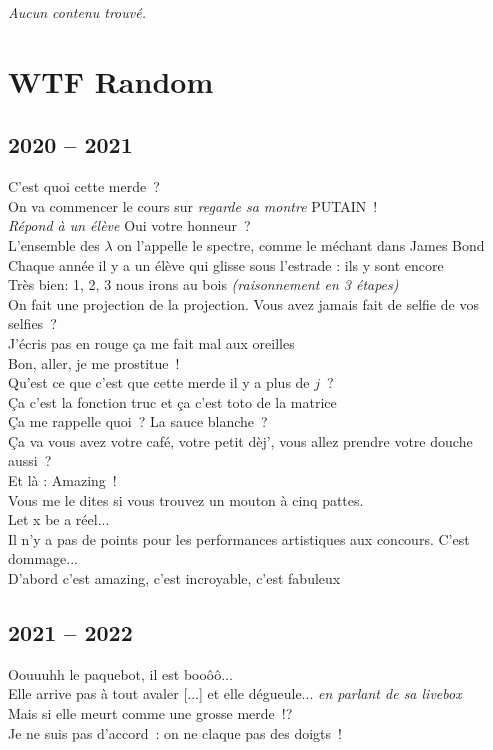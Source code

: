\documentclass[french, a4paper, openany]{book}
\begin{document}
	 \noindent \emph{Aucun contenu trouvé.} \\
 
\chapter{WTF Random}

\section{2020 -- 2021}

	\noindent \og C'est quoi cette merde~? \fg \\
	\og On va commencer le cours sur \emph{regarde sa montre} PUTAIN~! \fg \\
	\emph{Répond à un élève} \og Oui votre honneur~? \fg \\
	\og L'ensemble des $\lambda$ on l'appelle le spectre, comme le méchant dans James Bond \fg \\
	\og Chaque année il y a un élève qui glisse sous l'estrade : ils y sont encore \fg \\
	\og Très bien: 1, 2, 3 nous irons au bois \fg \emph{(raisonnement en 3 étapes)} \\
	\og On fait une projection de la projection. Vous avez jamais fait de selfie de vos selfies~? \fg \\
	\og J'écris pas en rouge ça me fait mal aux oreilles \fg \\
	\og Bon, aller, je me prostitue~! \fg \\
	\og Qu'est ce que c'est que cette merde il y a plus de $j$~? \fg \\
	\og Ça c'est la fonction truc et ça c'est toto de la matrice \fg \\
	\og Ça me rappelle quoi~? La sauce blanche~? \fg \\
	\og Ça va vous avez votre café, votre petit dèj', vous allez prendre votre douche aussi~? \fg \\
	\og Et là : Amazing~! \fg \\
	\og Vous me le dites si vous trouvez un mouton à cinq pattes. \fg \\
	\og Let x be a réel... \fg \\
	\og Il n'y a pas de points pour les performances artistiques aux concours. C'est dommage... \fg \\
	\og D'abord c'est amazing, c'est incroyable, c'est fabuleux \fg \\

\section{2021 -- 2022}

	\noindent \og Oouuuhh le paquebot, il est booôô... \fg \\
	\og Elle arrive pas à tout avaler [...] et elle dégueule... \fg \emph{en parlant de sa livebox} \\
	\og Mais si elle meurt comme une grosse merde~!? \fg \\
	\og Je ne suis pas d'accord~: on ne claque pas des doigts~! \fg \\
	
\end{document}
